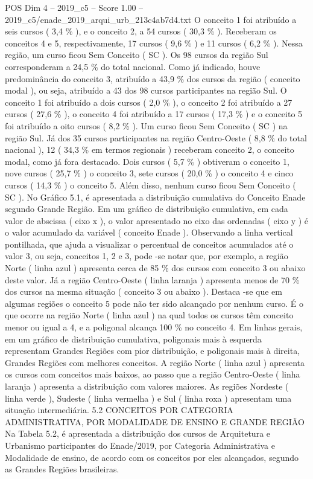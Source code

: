 \begin{textsample}{POS Dim 4 – 2019\_c5 – Score 1.00 – 2019\_c5/enade\_2019\_arqui\_urb\_213c4ab7d4.txt}
O conceito 1 foi atribuído a seis cursos ( 3,4 \% ), e o conceito 2, a 54 cursos ( 30,3 \% ).
Receberam os conceitos 4 e 5, respectivamente, 17 cursos ( 9,6 \% ) e 11 cursos ( 6,2 \% ).
Nessa região, um curso ficou Sem Conceito ( SC ).
Os 98 cursos da região Sul corresponderam a 24,5 \% do total nacional.
Como já indicado, houve predominância do conceito 3, atribuído a 43,9 \% dos cursos da região ( conceito modal ), ou seja, atribuído a 43 dos 98 cursos participantes na região Sul.
O conceito 1 foi atribuído a dois cursos ( 2,0 \% ), o conceito 2 foi atribuído a 27 cursos ( 27,6 \% ), o conceito 4 foi atribuído a 17 cursos ( 17,3 \% ) e o conceito 5 foi atribuído a oito cursos ( 8,2 \% ).
Um curso ficou Sem Conceito ( SC ) na região Sul.
Já dos 35 cursos participantes na região Centro-Oeste ( 8,8 \% do total nacional ), 12 ( 34,3 \% em termos regionais ) receberam conceito 2, o conceito modal, como já fora destacado.
Dois cursos ( 5,7 \% ) obtiveram o conceito 1, nove cursos ( 25,7 \% ) o conceito 3, sete cursos ( 20,0 \% ) o conceito 4 e cinco cursos ( 14,3 \% ) o conceito 5.
Além disso, nenhum curso ficou Sem Conceito ( SC ).
No Gráfico 5.1, é apresentada a distribuição cumulativa do Conceito Enade segundo Grande Região.
Em um gráfico de distribuição cumulativa, em cada valor de abscissa ( eixo x ), o valor apresentado no eixo das ordenadas ( eixo y ) é o valor acumulado da variável ( conceito Enade ).
Observando a linha vertical pontilhada, que ajuda a visualizar o percentual de conceitos acumulados até o valor 3, ou seja, conceitos 1, 2 e 3, pode -se notar que, por exemplo, a região Norte ( linha azul ) apresenta cerca de 85 \% dos cursos com conceito 3 ou abaixo deste valor.
Já a região Centro-Oeste ( linha laranja ) apresenta menos de 70 \% dos cursos na mesma situação ( conceito 3 ou abaixo ).
Destaca -se que em algumas regiões o conceito 5 pode não ter sido alcançado por nenhum curso.
É o que ocorre na região Norte ( linha azul ) na qual todos os cursos têm conceito menor ou igual a 4, e a poligonal alcança 100 \% no conceito 4.
Em linhas gerais, em um gráfico de distribuição cumulativa, poligonais mais à esquerda representam Grandes Regiões com pior distribuição, e poligonais mais à direita, Grandes Regiões com melhores conceitos.
A região Norte ( linha azul ) apresenta os cursos com conceitos mais baixos, ao passo que a região Centro-Oeste ( linha laranja ) apresenta a distribuição com valores maiores.
As regiões Nordeste ( linha verde ), Sudeste ( linha vermelha ) e Sul ( linha roxa ) apresentam uma situação intermediária. 5.2 CONCEITOS POR CATEGORIA ADMINISTRATIVA, POR MODALIDADE DE ENSINO E GRANDE REGIÃO Na Tabela 5.2, é apresentada a distribuição dos cursos de Arquitetura e Urbanismo participantes do Enade/2019, por Categoria Administrativa e Modalidade de ensino, de acordo com os conceitos por eles alcançados, segundo as Grandes Regiões brasileiras.

\end{textsample}
